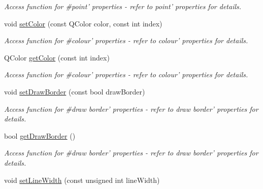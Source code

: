 \begin{DoxyCompactItemize}
\begin{DoxyCompactList}\small\item\em Access function for \#point' properties -\/ refer to point' properties for details. \end{DoxyCompactList}\item 
\hypertarget{classQEShape_a5caaf5d64de1c2685e69c4f8c1b9ca8f}{
void \hyperlink{classQEShape_a5caaf5d64de1c2685e69c4f8c1b9ca8f}{setColor} (const QColor color, const int index)}
\label{classQEShape_a5caaf5d64de1c2685e69c4f8c1b9ca8f}

\begin{DoxyCompactList}\small\item\em Access function for \#colour' properties -\/ refer to colour' properties for details. \end{DoxyCompactList}\item 
\hypertarget{classQEShape_ab0fa81e11c8962353ba84102a66eae47}{
QColor \hyperlink{classQEShape_ab0fa81e11c8962353ba84102a66eae47}{getColor} (const int index)}
\label{classQEShape_ab0fa81e11c8962353ba84102a66eae47}

\begin{DoxyCompactList}\small\item\em Access function for \#colour' properties -\/ refer to colour' properties for details. \end{DoxyCompactList}\item 
\hypertarget{classQEShape_a40211eca410fbe5f93a249129c201519}{
void \hyperlink{classQEShape_a40211eca410fbe5f93a249129c201519}{setDrawBorder} (const bool drawBorder)}
\label{classQEShape_a40211eca410fbe5f93a249129c201519}

\begin{DoxyCompactList}\small\item\em Access function for \#draw border' properties -\/ refer to draw border' properties for details. \end{DoxyCompactList}\item 
\hypertarget{classQEShape_a31df3d0027090dcc5e310b7922ca50ef}{
bool \hyperlink{classQEShape_a31df3d0027090dcc5e310b7922ca50ef}{getDrawBorder} ()}
\label{classQEShape_a31df3d0027090dcc5e310b7922ca50ef}

\begin{DoxyCompactList}\small\item\em Access function for \#draw border' properties -\/ refer to draw border' properties for details. \end{DoxyCompactList}\item 
\hypertarget{classQEShape_a7432e6f2263fe44fa952c0836714af21}{
void \hyperlink{classQEShape_a7432e6f2263fe44fa952c0836714af21}{setLineWidth} (const unsigned int lineWidth)}
\label{classQEShape_a7432e6f2263fe44fa952c0836714af21}


\end{DoxyCompactItemize}
